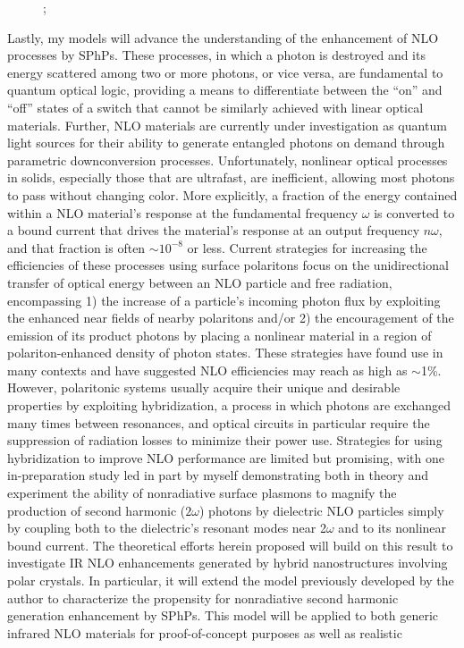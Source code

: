 \documentclass[11pt,a4paper]{article}
\newcommand{\infootcite}[1]{
    \textsuperscript{\citenum{#1}}\fullcite{#1}
}
\begin{document}
\begin{figure}[b!]
\vspace{-11pt}
\footnotesize{
\infootcite{medina_few-mode_2021};
\infootcite{gubbin_perspective_2021}
}
\end{figure}






Lastly, my models will advance the understanding of the enhancement of NLO processes by SPhPs. These processes, in which a photon is destroyed and its energy scattered among two or more photons, or vice versa, are fundamental to quantum optical logic, providing a means to differentiate between the ``on'' and ``off'' states of a switch that cannot be similarly achieved with linear optical materials.\supercite{sasikala_all_2018} Further, NLO materials are currently under investigation as quantum light sources for their ability to generate entangled photons on demand through parametric downconversion processes.\supercite{zhang_preparation_2011} Unfortunately, nonlinear optical processes in solids, especially those that are ultrafast, are inefficient, allowing most photons to pass without changing color. More explicitly, a fraction of the energy contained within a NLO material's response at the fundamental frequency $\omega$ is converted to a bound current that drives the material's response at an output frequency $n\omega$, and that fraction is often $\sim$$10^{-8}$ or less.\supercite{shi_efficient_2019} Current strategies for increasing the efficiencies of these processes using surface polaritons focus on the unidirectional transfer of optical energy between an NLO particle and free radiation, encompassing 1) the increase of a particle's incoming photon flux by exploiting the enhanced near fields of nearby polaritons and/or 2) the encouragement of the emission of its product photons by placing a nonlinear material in a region of polariton-enhanced density of photon states.\supercite{yi_doubly_2019} These strategies have found use in many contexts and have suggested NLO efficiencies may reach as high as $\sim$1\%.\supercite{lu_efficient_2011} However, polaritonic systems usually acquire their unique and desirable properties by exploiting hybridization, a process in which photons are exchanged many times between resonances, and optical circuits in particular require the suppression of radiation losses to minimize their power use. Strategies for using hybridization to improve NLO performance are limited but promising, with one in-preparation study led in part by myself demonstrating both in theory and experiment the ability of nonradiative surface plasmons to magnify the production of second harmonic ($2\omega$) photons by dielectric NLO particles simply by coupling both to the dielectric's resonant modes near 2$\omega$ and to its nonlinear bound current. The theoretical efforts herein proposed will build on this result to investigate IR NLO enhancements generated by hybrid nanostructures involving polar crystals. In particular, it will extend the model previously developed by the author to characterize the propensity for nonradiative second harmonic generation enhancement by SPhPs. This model will be applied to both generic infrared NLO materials for proof-of-concept purposes as well as realistic 
\end{document}
